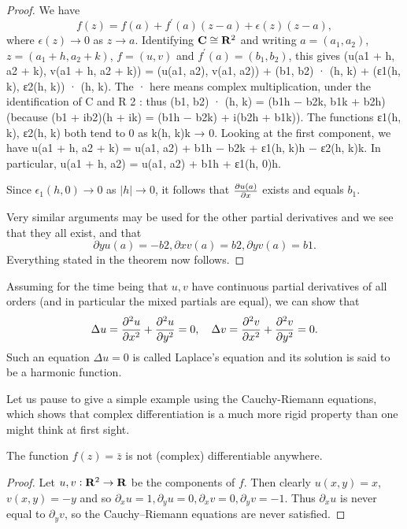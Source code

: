 \begin{proof}
We have
\[f(z)=f(a)+f^\prime(a)(z-a)+\epsilon(z)(z-a),\]
where $\epsilon(z)\to0$ as $z\to a$. Identifying $\mathbf C\cong\mathbf R^2$ and writing $a=(a_1,a_2)$, $z=(a_1+h,a_2+k)$, $f=(u,v)$ and $f^\prime(a)=(b_1,b_2)$, this gives
(u(a1 + h, a2 + k), v(a1 + h, a2 + k))
= (u(a1, a2), v(a1, a2)) + (b1, b2) · (h, k) + (ε1(h, k), ε2(h, k)) · (h, k).
The · here means complex multiplication, under the identification of C and
R
2
: thus
(b1, b2) · (h, k) = (b1h − b2k, b1k + b2h)
(because (b1 + ib2)(h + ik) = (b1h − b2k) + i(b2h + b1k)). The functions
ε1(h, k), ε2(h, k) both tend to 0 as k(h, k)k → 0.
Looking at the first component, we have
u(a1 + h, a2 + k) = u(a1, a2) + b1h − b2k + ε1(h, k)h − ε2(h, k)k.
In particular,
u(a1 + h, a2) = u(a1, a2) + b1h + ε1(h, 0)h.

Since $\epsilon_1(h,0)\to0$ as $|h|\to0$, it follows that $\pdv{u(a)}{x}$ exists and equals $b_1$.

Very similar arguments may be used for the other partial derivatives and we see that they all exist, and that
\[∂yu(a) = −b2, ∂xv(a) = b2, ∂yv(a) = b1.\]
Everything stated in the theorem now follows. 
\end{proof}

Assuming for the time being that $u,v$ have continuous partial derivatives of all orders (and in particular the mixed partials are equal), we can show that
\[\Delta u=\pdv[2]{u}{x}+\pdv[2]{u}{y}=0,\quad\Delta v=\pdv[2]{v}{x}+\pdv[2]{v}{y}=0.\]
Such an equation $\Delta u=0$ is called Laplace's equation and its solution is said to be a harmonic function.

Let us pause to give a simple example using the Cauchy-Riemann equations, which shows that complex differentiation is a much more rigid property than one might think at first sight.

\begin{example}
The function $f(z)=\bar{z}$ is not (complex) differentiable anywhere.
\end{example}

\begin{proof}
Let $u,v:\mathbf R^2\to\mathbf R$ be the components of $f$. Then clearly $u(x,y) = x$, $v(x,y)=-y$ and so $\partial_x u=1,\partial_y u=0, \partial_x v=0, \partial_y v=-1$. Thus $\partial_xu$ is never equal to $\partial_yv$, so the Cauchy--Riemann equations are never satisfied.
\end{proof}

